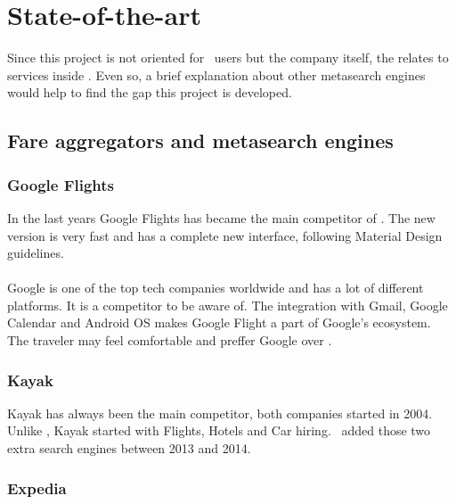 
\chapter{State-of-the-art}

\label{chapter02}

Since this project is not oriented for \company\ users but the company itself, the \textit{} relates to services inside \company. Even so, a brief explanation about other metasearch engines would help to find the gap this project is developed.


\section{Fare aggregators and metasearch engines}

\subsection{Google Flights}

In the last years Google Flights\cite{google_flights} has became the main competitor of \company. The new version is very fast and has a complete new interface, following Material Design\cite{material_design} guidelines.
\\\\
Google is one of the top tech companies worldwide and has a lot of different platforms. It is a competitor to be aware of. The integration with Gmail, Google Calendar and Android OS makes Google Flight a part of Google's ecosystem. The traveler may feel comfortable and preffer Google over \company.

\subsection{Kayak}

Kayak\cite{kayak} has always been the main competitor, both companies started in 2004. Unlike \company, Kayak started with Flights, Hotels and Car hiring. \company\ added those two extra search engines between 2013 and 2014.

\subsection{Expedia}

